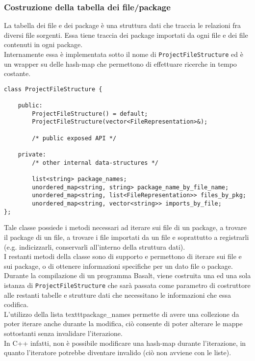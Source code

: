 
\subsubsection{Costruzione della tabella dei file/package}
La tabella dei file e dei package è una struttura dati che traccia le relazioni fra 
diversi file sorgenti. Essa tiene traccia dei package importati da ogni file e dei file 
contenuti in ogni package. \\

Internamente essa è implementata sotto il nome di \texttt{ProjectFileStructure} 
ed è un wrapper su delle hash-map che permettono di
effettuare ricerche in tempo costante. \\

\vspace{0.5cm}
\begin{lstlisting}[frame=single]
class ProjectFileStructure {

    public:
        ProjectFileStructure() = default;
        ProjectFileStructure(vector<FileRepresentation>&);

        /* public exposed API */

    private:
        /* other internal data-structures */ 
        
        list<string> package_names;
        unordered_map<string, string> package_name_by_file_name;
        unordered_map<string, list<FileRepresentation>> files_by_pkg;
        unordered_map<string, vector<string>> imports_by_file;
};
\end{lstlisting}
\vspace{0.5cm}

Tale classe possiede i metodi necessari ad iterare sui file di un package, a trovare
il package di un file, a trovare i file importati da un file e soprattutto a 
registrarli (e.g. indicizzarli, conservarli all'interno della struttura dati). \\

I restanti metodi della classe sono di supporto e permettono di iterare sui file e 
sui package, o di ottenere informazioni specifiche per un dato file o package. \\

Durante la compilazione di un programma Basalt, viene costruita una ed una sola 
istanza di \texttt{ProjectFileStructure} che sarà passata come parametro di costruttore 
alle restanti tabelle e strutture dati che necessitano le informazioni che essa codifica. \\

L'utilizzo della lista texttt{package\_names} permette di avere una collezione da poter iterare 
anche durante la modifica, ciò consente di poter alterare le mappe sottostanti senza invalidare 
l'iterazione. \\

In C++ infatti, non è possibile modificare una hash-map durante l'iterazione, in quanto 
l'iteratore potrebbe diventare invalido (ciò non avviene con le liste).